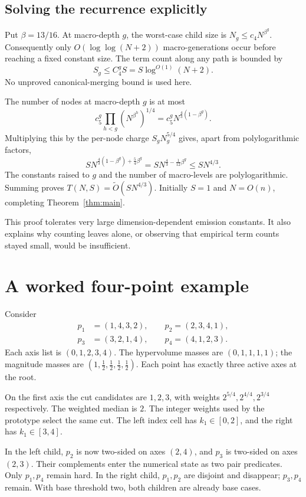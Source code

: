 \documentclass[12pt,a4paper]{article}
\theoremstyle{remark}
\newcommand{\1}{\mathbf1}
\newcommand{\wtO}{\widetilde O}
\begin{document}
\subsection{Solving the recurrence explicitly}
Put $\beta=13/16$. At macro-depth $g$, the worst-case child size is
$N_g\le c_4N^{\beta^g}$. Consequently only $O(\log\log(N+2))$
macro-generations occur before reaching a fixed constant size. The term
count along any path is bounded by
\begin{equation}
                     S_g\le C_4^gS=S\log^{O(1)}(N+2).
                                                        \label{eq:terms}
\end{equation}
No unproved canonical-merging bound is used here.

The number of nodes at macro-depth $g$ is at most
\[
 c_5^g\prod_{h<g}(N^{\beta^h})^{1/4}
       =c_5^gN^{\frac43(1-\beta^g)}.
\]
Multiplying this by the per-node charge $S_gN_g^{5/4}$ gives, apart from
polylogarithmic factors,
\[
 S N^{\frac43(1-\beta^g)+\frac54\beta^g}
       =S N^{\frac43-\frac1{12}\beta^g}
       \le S N^{4/3}.
\]
The constants raised to $g$ and the number of macro-levels are
polylogarithmic. Summing proves $T(N,S)=\wtO(SN^{4/3})$.
Initially $S=1$ and $N=O(n)$, completing Theorem~\ref{thm:main}.

This proof tolerates very large dimension-dependent emission constants.
It also explains why counting leaves alone, or observing that empirical
term counts stayed small, would be insufficient.

\section{A worked four-point example}\label{sec:example}
Consider
\[
\begin{split}
 p_1&=(1,4,3,2),\qquad p_2=(2,3,4,1),\\
 p_3&=(3,2,1,4),\qquad p_4=(4,1,2,3).
\end{split}
\]
Each axis list is $(0,1,2,3,4)$. The hypervolume masses are
$(0,1,1,1,1)$; the magnitude masses are
$(1,\tfrac12,\tfrac12,\tfrac12,\tfrac12)$.
Each point has exactly three active axes at the root.

On the first axis the cut candidates are $1,2,3$, with weights
$2^{5/4},2^{4/4},2^{3/4}$ respectively. The weighted median is $2$.
The integer weights used by the prototype select the same cut.
The left index cell has $k_1\in[0,2]$, and the right has $k_1\in[3,4]$.

In the left child, $p_2$ is now two-sided on axes $(2,4)$, and $p_3$
is two-sided on axes $(2,3)$. Their complements enter the numerical state
as two pair predicates. Only $p_1,p_4$ remain hard.
In the right child, $p_1,p_2$ are disjoint and disappear; $p_3,p_4$ remain.
With base threshold two, both children are already base cases.
\end{document}
